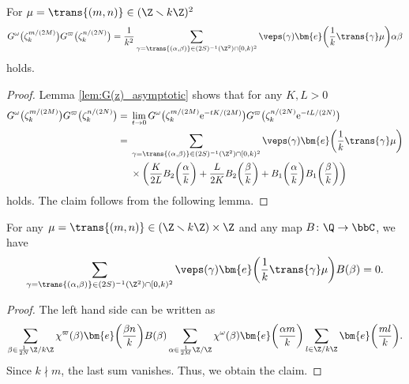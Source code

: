 \begin{prop} \label{prop:G(z)_value}
	For $ \mu = \trans{(m, n)} \in (\Z \smallsetminus k\Z)^2 $
	\begin{gather*}
	G^\omega\big(\zeta_k^{m/(2M)}\big) G^\varpi\big(\zeta_k^{n/(2N)}\big)
	= \frac{1}{k^2} \sum_{ \gamma = \trans{(\alpha, \beta)} \in (2S)^{-1}(\Z^2) \cap [0, k)^2}
	\veps(\gamma) \bm{e}\bigg( \frac{1}{k} \trans{\gamma} \mu \bigg) \alpha \beta
	\end{gather*}
	holds.
\end{prop}
\begin{proof}
	Lemma \ref{lem:G(z)_asymptotic} shows that for any $ K, L > 0 $
	\begin{align*}
		G^\omega\big(\zeta_k^{m/(2M)}\big) G^\varpi\big(\zeta_k^{n/(2N)}\big)
	= {}&\lim_{t \to 0} G^\omega\big(\zeta_k^{m/(2M)} {\rm e}^{-tK/(2M)}\big) G^\varpi\big(\zeta_k^{n/(2N)} {\rm e}^{-tL/(2N)}\big)
\\
		= {}&\sum_{\gamma = \trans{(\alpha, \beta)} \in (2S)^{-1}(\Z^2) \cap [0, k)^2} \veps(\gamma) \bm{e}\bigg(\frac{1}{k} \trans{\gamma} \mu \bigg)
\\
	&\times	\bigg(
		\frac{K}{2L} B_2 \bigg( \frac{\alpha}{k} \bigg)
		+ \frac{L}{2K} B_2 \bigg( \frac{\beta}{k} \bigg)
		+ B_1 \bigg( \frac{\alpha}{k} \bigg) B_1 \bigg( \frac{\beta}{k} \bigg)
		\bigg)
	\end{align*}
	holds.
	The claim follows from the following lemma.
\end{proof}
\begin{lem} %
	For any $ \mu = \trans{(m, n)} \in (\Z \smallsetminus k\Z) \times \Z $ and any map $ B \colon \Q \to \bbC $, we have
	\begin{gather*}
	\sum_{\gamma = \trans{(\alpha, \beta)} \in (2S)^{-1}(\Z^2) \cap [0, k)^2}
	\veps(\gamma) \bm{e}\bigg( \frac{1}{k} \trans{\gamma} \mu \bigg) B (\beta)
	= 0.
	\end{gather*}
\end{lem}
\begin{proof}
	The left hand side can be written as
	\begin{gather*}
	\sum_{\beta \in \frac{1}{2N}\Z/k\Z} \chi^\varpi(\beta) \bm{e}\bigg( \frac{\beta n}{k} \bigg) B (\beta)
	\sum_{\alpha \in \frac{1}{2M}\Z/\Z} \chi^\omega(\beta) \bm{e}\bigg( \frac{\alpha m}{k} \bigg)
	\sum_{l \in \Z/k\Z} \bm{e}\bigg( \frac{ml}{k} \bigg).
	\end{gather*}
	Since $ k \nmid m $, the last sum vanishes.
	Thus, we obtain the claim.
\end{proof}
